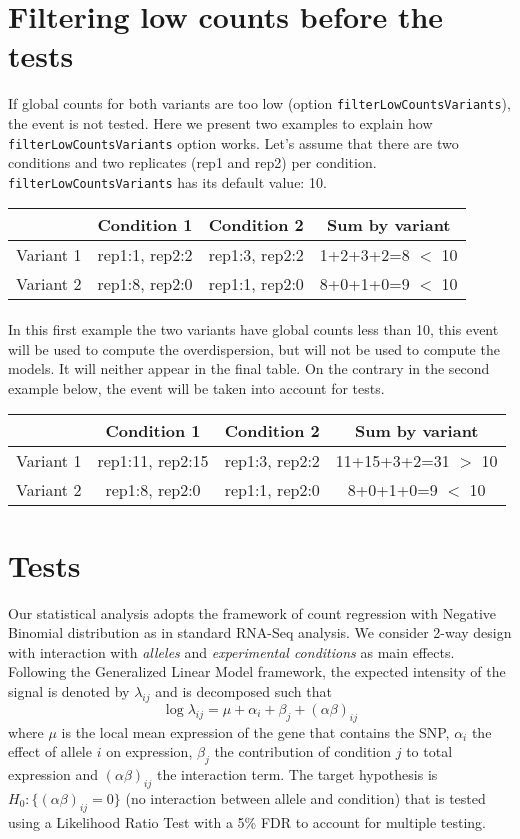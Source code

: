 \documentclass[a4paper,10pt]{article}
\begin{document}
\section{Filtering low counts before the tests}
 If global counts for both variants are too low (option \texttt{filterLowCountsVariants}), the event is not tested.
Here we present two examples to explain how \texttt{filterLowCountsVariants} option works. Let's assume that there are two conditions and two replicates (rep1 and rep2) per condition. \texttt{filterLowCountsVariants} has its default value: 10.\\

\begin{tabular}{r|c|c|c}
  \hline
   & Condition 1 & Condition 2& Sum by variant \\
  \hline
  Variant 1 &	rep1:1, rep2:2 & rep1:3, rep2:2& 1+2+3+2=8 $<$ 10  \\
 Variant 2 &	rep1:8, rep2:0 & rep1:1, rep2:0& 8+0+1+0=9 $<$ 10 \\
  \hline
\end{tabular}
\paragraph{}In this first example the two variants have global counts less than 10, this event will be used to compute the overdispersion, but will not be used to compute the models. It will neither appear in the final table. On the contrary in the second example below, the event will be taken into account for tests.\\

\begin{tabular}{r|c|c|c}
  \hline
   & Condition 1 & Condition 2& Sum by variant \\
  \hline
  Variant 1 &	rep1:11, rep2:15 & rep1:3, rep2:2&  11+15+3+2=31 $>$ 10 \\
 Variant 2 &	rep1:8, rep2:0 & rep1:1, rep2:0& 8+0+1+0=9 $<$ 10 \\
  \hline
\end{tabular}


\section{Tests}
Our statistical analysis adopts the framework of count regression with Negative Binomial distribution as in standard RNA-Seq analysis. We consider 2-way design with interaction with \textit{alleles} and \textit{experimental conditions} as main effects. Following the Generalized Linear Model framework, the expected intensity of the signal is denoted by $\lambda_{ij}$ and is decomposed such that
$$
\log \lambda_{ij} = \mu + \alpha_{i} +\beta_{j} + \left(\alpha \beta \right)_{ij}
$$
where $\mu$ is the local mean expression of the gene that contains the SNP, $\alpha_{i}$ the effect of allele $i$ on expression, $\beta_{j}$ the contribution of condition $j$ to total expression and $\left(\alpha \beta \right)_{ij}$ the interaction term. The target hypothesis is $H_0:\{\left(\alpha \beta \right)_{ij}=0\}$ (no interaction between allele and condition) that is tested using a Likelihood Ratio Test with a 5\% FDR to account for multiple testing.
\end{document}
